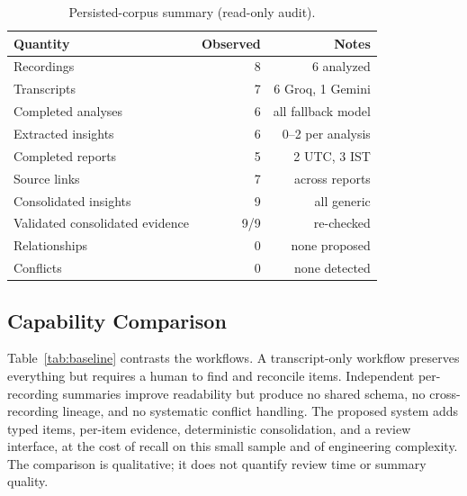 \documentclass[conference,a4paper]{IEEEtran}
\begin{document}
\begin{table}[t]
\centering
\caption{Persisted-corpus summary (read-only audit).}
\label{tab:corpus}
\small
\renewcommand{\arraystretch}{1.1}
\begin{tabular}{@{}lrr@{}}
\toprule
Quantity & Observed & Notes \\
\midrule
Recordings & 8 & 6 analyzed \\
Transcripts & 7 & 6 Groq, 1 Gemini \\
Completed analyses & 6 & all fallback model \\
Extracted insights & 6 & 0--2 per analysis \\
Completed reports & 5 & 2 UTC, 3 IST \\
Source links & 7 & across reports \\
Consolidated insights & 9 & all generic \\
Validated consolidated evidence & 9/9 & re-checked \\
Relationships & 0 & none proposed \\
Conflicts & 0 & none detected \\
\bottomrule
\end{tabular}
\end{table}

\subsection{Capability Comparison}

Table~\ref{tab:baseline} contrasts the workflows. A transcript-only workflow preserves
everything but requires a human to find and reconcile items. Independent per-recording
summaries improve readability but produce no shared schema, no cross-recording lineage, and
no systematic conflict handling. The proposed system adds typed items, per-item evidence,
deterministic consolidation, and a review interface, at the cost of recall on this small
sample and of engineering complexity. The comparison is qualitative; it does not quantify
review time or summary quality.
\end{document}
